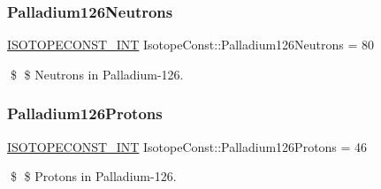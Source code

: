 \subsubsection{\texorpdfstring{Palladium126\+Neutrons}{Palladium126Neutrons}}
{\footnotesize\ttfamily \mbox{\hyperlink{group___isotope_const-_macros_ga5f18360b3e99483a35c32d789e62621c}{I\+S\+O\+T\+O\+P\+E\+C\+O\+N\+S\+T\+\_\+\+I\+NT}} Isotope\+Const\+::\+Palladium126\+Neutrons = 80}

\$ \$ Neutrons in Palladium-\/126. \mbox{\label{group___isotope_const-_palladium-_pd126_gac01e7c06ef579910fabc36b8b225b728}} 
\subsubsection{\texorpdfstring{Palladium126\+Protons}{Palladium126Protons}}
{\footnotesize\ttfamily \mbox{\hyperlink{group___isotope_const-_macros_ga5f18360b3e99483a35c32d789e62621c}{I\+S\+O\+T\+O\+P\+E\+C\+O\+N\+S\+T\+\_\+\+I\+NT}} Isotope\+Const\+::\+Palladium126\+Protons = 46}

\$ \$ Protons in Palladium-\/126. 